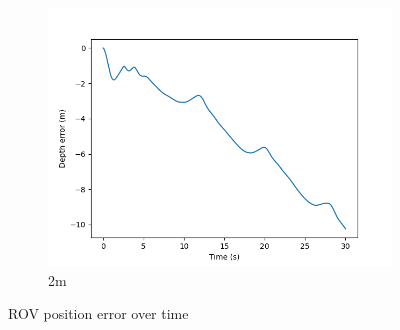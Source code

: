 \documentclass[class=article, crop=false]{standalone}
\begin{document}
\begin{figure}
\begin{subfigure}[b]{0.48\textwidth}
        \includegraphics{scenario1/rov-100m/2.0m/rov_depth_error_uncontrolled}
        \caption{2m}
        \label{}
    \end{subfigure}

    \caption{ROV position error over time}
\end{figure}
\end{document}
